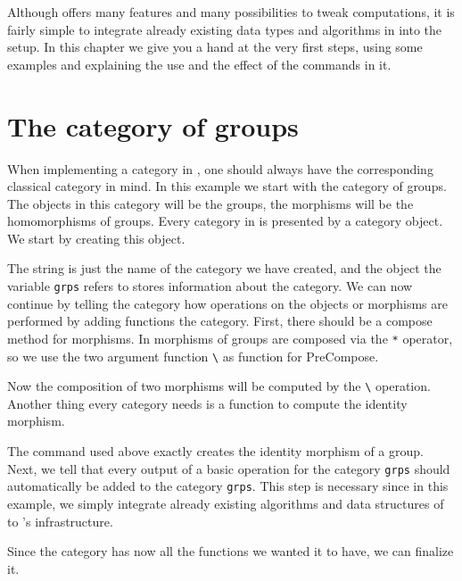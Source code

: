 Although \CapPkg offers many features and many possibilities to tweak computations,
it is fairly simple to integrate already existing data types and algorithms in \GAP
into the \CapPkg setup. In this chapter we give you a hand at the very first steps, using some
examples and explaining the use and the effect of the commands in it.

\section{The category of groups}\label{section:groups}

When implementing a category in \CapPkg, one should always have the corresponding classical
category in mind. In this example we start with the category of groups. The objects in this
category will be the groups, the morphisms will be the homomorphisms of groups. Every category
in \CapPkg is presented by a category \GAP object. We start by creating this object.



The string is just the name of the category we have created, and the object the variable
\texttt{grps} refers to stores information about the category. We can now continue by
telling the category how operations on the objects or morphisms are performed by adding
functions the category. First, there should be a compose method for morphisms. In \GAP
morphisms of groups are composed via the \texttt{*} operator, so we use the two
argument function \texttt{\textbackslash *} as function for \textrm{PreCompose}.



Now the composition of two morphisms will be computed by the \texttt{\textbackslash *} operation.
Another thing every category needs is a function to compute the identity morphism.



The command used above exactly creates the identity morphism of a group.
Next, we tell \CapPkg that every output of a basic operation for the category \texttt{grps} should automatically be added to the category \texttt{grps}.
This step is necessary since in this example, we simply integrate already existing algorithms and data structures of \GAP to
\CapPkg's infrastructure.



Since the category has now all the functions we wanted it to have, we can finalize it.

